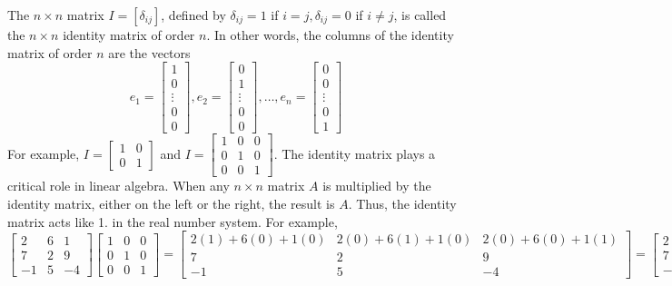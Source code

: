 \documentclass[../main.tex]{subfiles}
\begin{document}
\begin{definition}
	\label{defn:defn_1_10}The $n \times n$ matrix $I=\left[\delta_{i j}\right]$, defined by $\delta_{i j}=1$ if $i=j, \delta_{i j}=0$ if $i \neq j$, is called the $n \times n$ identity matrix of order $n$. In other words, the columns of the identity matrix of order $n$ are the vectors
$$
e_{1}=\left[\begin{array}{c}
1 \\
0 \\
\vdots \\
0 \\
0
\end{array}\right], e_{2}=\left[\begin{array}{c}
0 \\
1 \\
\vdots \\
0 \\
0
\end{array}\right], \ldots, e_{n}=\left[\begin{array}{c}
0 \\
0 \\
\vdots \\
0 \\
1
\end{array}\right]
$$
For example, $I=\left[\begin{array}{ll}1 & 0 \\ 0 & 1\end{array}\right]$ and $I=\left[\begin{array}{lll}1 & 0 & 0 \\ 0 & 1 & 0 \\ 0 & 0 & 1\end{array}\right]$. The identity matrix plays a critical role in linear algebra. When any $n \times n$ matrix $A$ is multiplied by the identity matrix, either on the left or the right, the result is $A$. Thus, the identity matrix acts like
1. in the real number system. For example,
$$
\left[\begin{array}{ccc}
2 & 6 & 1 \\
7 & 2 & 9 \\
-1 & 5 & -4
\end{array}\right]\left[\begin{array}{lll}
1 & 0 & 0 \\
0 & 1 & 0 \\
0 & 0 & 1
\end{array}\right]=\left[\begin{array}{ccc}
2(1)+6(0)+1(0) & 2(0)+6(1)+1(0) & 2(0)+6(0)+1(1) \\
7 & 2 & 9 \\
-1 & 5 & -4
\end{array}\right]=\left[\begin{array}{ccc}
2 & 6 & 1 \\
7 & 2 & 9 \\
-1 & 5 & -4
\end{array}\right]
$$\\
\end{definition}
\end{document}
